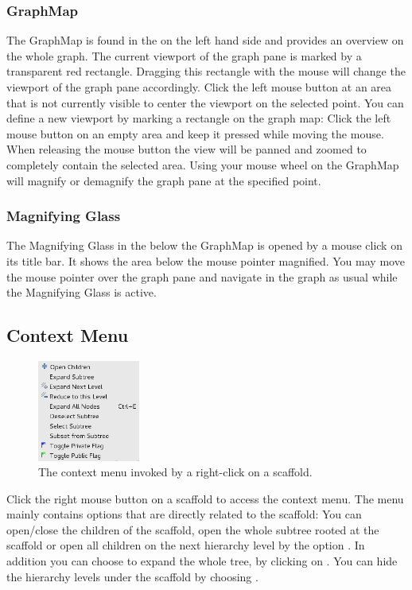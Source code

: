 \subsubsection{GraphMap} \label{sec:treeview:graphmap}
The GraphMap is found in the \sbar on the left hand side and provides an
overview on the whole graph. The current viewport of the graph pane is marked by
a transparent red rectangle. Dragging this rectangle with the mouse will change
the viewport of the graph pane accordingly. Click the left mouse button at an
area that is not currently visible to center the viewport on the selected point.
You can define a new viewport by marking a rectangle on the graph map: Click the
left mouse button on an empty area and keep it pressed while moving the mouse.
When releasing the mouse button the view will be panned and zoomed to completely
contain the selected area. Using your mouse wheel on the GraphMap will magnify
or demagnify the graph pane at the specified point.

\subsubsection{Magnifying Glass}
The Magnifying Glass in the \sbar below the GraphMap is opened by a mouse click on its title bar. It shows the area below the mouse 
pointer magnified. You may move the mouse pointer over the graph pane and navigate in the graph as usual while the Magnifying Glass is 
active.



\subsection{Context Menu} \label{sec:treeview:contextmenu}
\begin{figure}[!htb]
   \centering
   \includegraphics[width=0.3\textwidth]{images/stree/contextmenu.png}
   \caption[\Stview contex menu]{The context menu invoked by a right-click on a scaffold.}
   \label{fig:scaffoldhunter:contextmenu}
\end{figure}
Click the right mouse button on a scaffold to access the context menu. The menu mainly contains options that are directly related to the 
scaffold: You can open/close the children of the scaffold, open the whole subtree rooted at the scaffold or open all children on the next 
hierarchy level by the option . In addition you can
choose to expand the whole tree, by clicking on . You can
hide the hierarchy levels under the scaffold by choosing .

